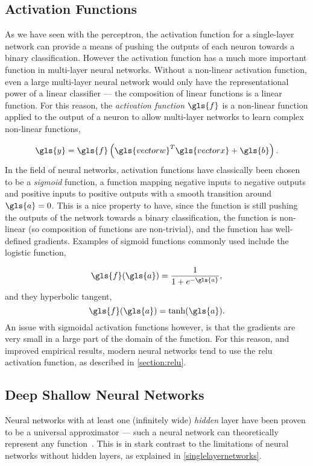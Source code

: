 \documentclass[thesis]{subfiles}
\begin{document}
\subsection{Activation Functions}\label{activationfunctions}
As we have seen with the perceptron, the activation function for a single-layer network can provide a means of pushing the outputs of each neuron towards a binary classification. However the activation function has a much more important function in multi-layer neural networks. Without a non-linear activation function, even a large multi-layer neural network would only have the representational power of a linear classifier --- the composition of linear functions is a linear function. For this reason, the \emph{activation function} $\gls{f}$ is a non-linear function applied to the output of a neuron to allow multi-layer networks to learn complex non-linear functions,

\begin{equation}
\gls{y} = \gls{f}\left(\gls{vectorw}^T\gls{vectorx} + \gls{b}\right).
\end{equation}
%
In the field of neural networks, activation functions have classically been chosen to be a \emph{sigmoid} function, \ie a function mapping negative inputs to negative outputs and positive inputs to positive outputs with a smooth transition around $\gls{a} = 0$. This is a nice property to have, since the function is still pushing the outputs of the network towards a binary classification, the function is non-linear (so composition of functions are non-trivial), and the function has well-defined gradients. Examples of sigmoid functions commonly used include the logistic function, 

\begin{equation}
	\gls{f}(\gls{a}) = \frac{1}{1+e^{-\gls{a}}},
\end{equation}
%
and they hyperbolic tangent,
\begin{equation}
	\gls{f}(\gls{a}) = \tanh(\gls{a}).
\end{equation}
%
An issue with sigmoidal activation functions however, is that the gradients are very small in a large part of the domain of the function. For this reason, and improved empirical results, modern neural networks tend to use the \gls{relu} activation function, as described in \cref{section:relu}.


\subsection{Deep \texorpdfstring{\Vs}{Vs.} Shallow Neural Networks}
Neural networks with at least one (infinitely wide) \emph{hidden} layer have been proven to be a universal approximator --- \ie such a neural network can theoretically represent any function~\citep{journals/mcss/Cybenko92,hornik89a}. This is in stark contrast to the limitations of neural networks without hidden layers, as explained in \cref{singlelayernetworks}.
\end{document}

